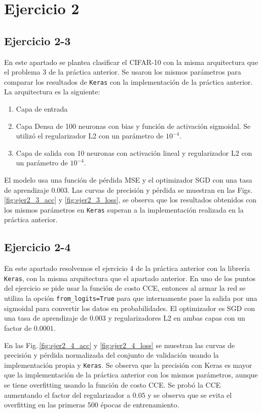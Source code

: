 \section*{Ejercicio 2}

\subsection*{Ejercicio 2-3}
    En este apartado se plantea clasificar el CIFAR-10 con la misma arquitectura que el problema 3 de la práctica anterior. Se usaron los mismos parámetros para comparar los resultados de \verb|Keras| con la implementación de la práctica anterior. La arquitectura es la siguiente:

    \begin{enumerate}
        \item Capa de entrada
        \item Capa Densa de 100 neuronas con bias y función de activación sigmoidal. Se utilizó el regularizador L2 con un parámetro de $10^{-4}$.
        \item Capa de salida con 10 neuronas con activación lineal y  regularizador L2 con un parámetro de $10^{-4}$.
    \end{enumerate}

    El modelo usa una función de pérdida MSE y el optimizador SGD con una tasa de aprendizaje 0.003. Las curvas de precisión y pérdida se muestran en las Figs.\ref{fig:ejer2_3_acc} y \ref{fig:ejer2_3_loss}, se observa que los resultados obtenidos con los mismos parámetros en \verb|Keras| superan a la implementación realizada en la práctica anterior.


\subsection*{Ejercicio 2-4}

    En este apartado resolvemos el ejercicio 4 de la práctica anterior con la librería \verb|Keras|, con la misma arquitectura que el apartado anterior. En uno de los puntos del ejercicio se pide usar la función de costo CCE, entonces al armar la red se utiliza la opción \verb|from_logits=True| para que internamente pase la salida por una sigmoidal para convertir los datos en probabilidades. El optimizador es SGD con una tasa de aprendizaje de 0.003 y regularizadores L2 en ambas capas con un factor de $0.0001$.

    En las Fig.\,\ref{fig:ejer2_4_acc} y \ref{fig:ejer2_4_loss} se muestran las curvas de precisión y pérdida normalizada del conjunto de validación usando la implementación propia y \verb|Keras|. Se observa que la precisión con Keras es mayor que la implementación de la práctica anterior con los mismos parámetros, aunque se tiene overfitting usando la función de costo CCE. Se probó la CCE aumentando el factor del regularizador a $0.05$ y se observa que se evita el overfitting en las primeras 500 épocas de entrenamiento.




